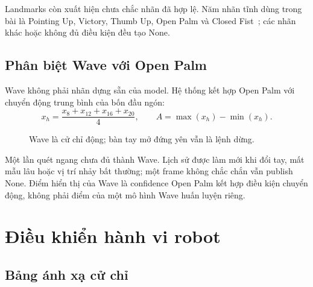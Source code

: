 \documentclass[12pt,a4paper]{article}
\begin{document}
Landmarks còn xuất hiện chưa chắc nhãn đã hợp lệ. Năm nhãn tĩnh dùng trong bài là Pointing Up, Victory, Thumb Up, Open Palm và Closed Fist~\cite{mp_overview}; các nhãn khác hoặc không đủ điều kiện đều tạo None.

\subsection{Phân biệt Wave với Open Palm}
Wave không phải nhãn dựng sẵn của model. Hệ thống kết hợp Open Palm với chuyển động trung bình của bốn đầu ngón:
\begin{equation}
 x_h=\frac{x_8+x_{12}+x_{16}+x_{20}}{4},\qquad
 A=\max(x_h)-\min(x_h).
\end{equation}

\begin{figure}[!htbp]\centering
{}
\caption{Wave là cử chỉ động; bàn tay mở đứng yên vẫn là lệnh dừng.}
\label{fig:wave-flow}
\end{figure}

Một lần quét ngang chưa đủ thành Wave. Lịch sử được làm mới khi đổi tay, mất mẫu lâu hoặc vị trí nhảy bất thường; một frame không chắc chắn vẫn publish None. Điểm hiển thị của Wave là confidence Open Palm kết hợp điều kiện chuyển động, không phải điểm của một mô hình Wave huấn luyện riêng.

\section{Điều khiển hành vi robot}
\subsection{Bảng ánh xạ cử chỉ}
\end{document}
